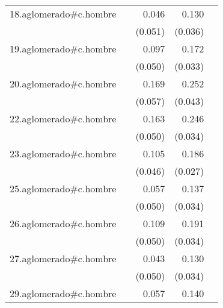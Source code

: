 {\begin{longtable}{l*{4}{D{.}{.}{-1}}}
\addlinespace
18.aglomerado#c.hombre&                     &       0.046         &       0.130\sym{***}&                     \\
            &                     &     (0.051)         &     (0.036)         &                     \\
\addlinespace
19.aglomerado#c.hombre&                     &       0.097\sym{*}  &       0.172\sym{***}&                     \\
            &                     &     (0.050)         &     (0.033)         &                     \\
\addlinespace
20.aglomerado#c.hombre&                     &       0.169\sym{**} &       0.252\sym{***}&                     \\
            &                     &     (0.057)         &     (0.043)         &                     \\
\addlinespace
22.aglomerado#c.hombre&                     &       0.163\sym{**} &       0.246\sym{***}&                     \\
            &                     &     (0.050)         &     (0.034)         &                     \\
\addlinespace
23.aglomerado#c.hombre&                     &       0.105\sym{*}  &       0.186\sym{***}&                     \\
            &                     &     (0.046)         &     (0.027)         &                     \\
\addlinespace
25.aglomerado#c.hombre&                     &       0.057         &       0.137\sym{***}&                     \\
            &                     &     (0.050)         &     (0.034)         &                     \\
\addlinespace
26.aglomerado#c.hombre&                     &       0.109\sym{*}  &       0.191\sym{***}&                     \\
            &                     &     (0.050)         &     (0.034)         &                     \\
\addlinespace
27.aglomerado#c.hombre&                     &       0.043         &       0.130\sym{***}&                     \\
            &                     &     (0.050)         &     (0.034)         &                     \\
\addlinespace
29.aglomerado#c.hombre&                     &       0.057         &       0.140\sym{***}&                     \\

\end{longtable}}
